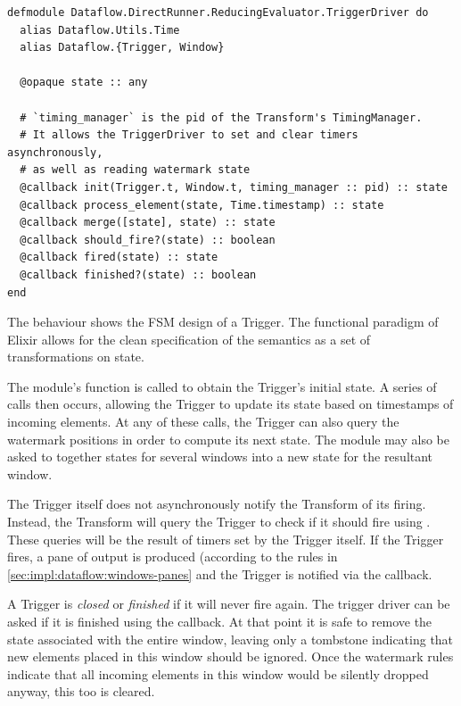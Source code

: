 \begin{listing}[h]
	\begin{verbatim}
defmodule Dataflow.DirectRunner.ReducingEvaluator.TriggerDriver do
  alias Dataflow.Utils.Time
  alias Dataflow.{Trigger, Window}
  
  @opaque state :: any
  
  # `timing_manager` is the pid of the Transform's TimingManager.
  # It allows the TriggerDriver to set and clear timers asynchronously,
  # as well as reading watermark state
  @callback init(Trigger.t, Window.t, timing_manager :: pid) :: state
  @callback process_element(state, Time.timestamp) :: state
  @callback merge([state], state) :: state
  @callback should_fire?(state) :: boolean
  @callback fired(state) :: state
  @callback finished?(state) :: boolean
end
	\end{verbatim}
\caption[The  behaviour showing the Finite State Machine design of a Trigger.]{The  behaviour shows the FSM design of a Trigger. The functional paradigm of Elixir allows for the clean specification of the semantics as a set of transformations on state.}
\label{lst:impl:trigger_driver}
\end{listing}

The module's  function is called to obtain the Trigger's initial state.
A series of  calls then occurs, allowing the Trigger to update its state based on timestamps of incoming elements.
At any of these calls, the Trigger can also query the watermark positions in order to compute its next state.
The module may also be asked to  together states for several windows into a new state for the resultant window.

The Trigger itself does not asynchronously notify the Transform of its firing.
Instead, the Transform will query the Trigger to check if it should fire using .
These queries will be the result of timers set by the Trigger itself.
If the Trigger fires, a pane of output is produced (according to the rules in \cref{sec:impl:dataflow:windows-panes} and the Trigger is notified via the  callback.

A Trigger is \emph{closed} or \emph{finished} if it will never fire again.
The trigger driver can be asked if it is finished using the  callback.
At that point it is safe to remove the state associated with the entire window, leaving only a tombstone indicating that new elements placed in this window should be ignored.
Once the watermark rules indicate that all incoming elements in this window would be silently dropped anyway, this too is cleared.

